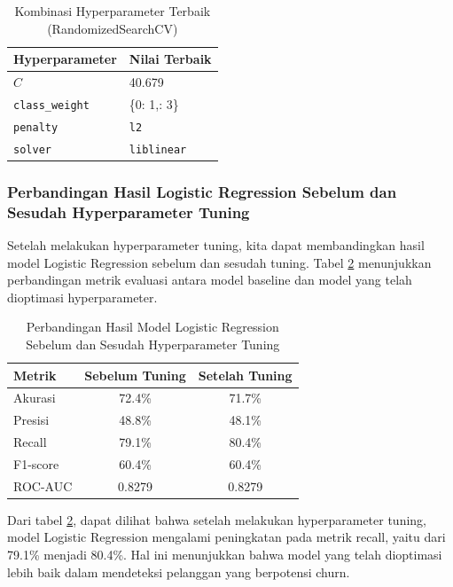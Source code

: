 \begin{table}[H]
    \centering
    \caption{Kombinasi Hyperparameter Terbaik (RandomizedSearchCV)}
    \label{tab:best_params_logreg}
    \begin{tabular}{|l|l|}
        \hline
        \textbf{Hyperparameter} & \textbf{Nilai Terbaik} \\ \hline
        $C$ & 40.679 \\ \hline
        \texttt{class\_weight} & \{0: 1,\; 1: 3\} \\ \hline
        \texttt{penalty} & \texttt{l2} \\ \hline
        \texttt{solver} & \texttt{liblinear} \\ \hline
    \end{tabular}
\end{table}

\subsubsection{Perbandingan Hasil Logistic Regression Sebelum dan Sesudah Hyperparameter Tuning}
Setelah melakukan hyperparameter tuning, kita dapat membandingkan hasil model Logistic Regression sebelum dan sesudah tuning. Tabel \ref{tab:comparison_logreg} menunjukkan perbandingan metrik evaluasi antara model baseline dan model yang telah dioptimasi hyperparameter.

\begin{table}[H]
    \centering
    \caption{Perbandingan Hasil Model Logistic Regression Sebelum dan Sesudah Hyperparameter Tuning}
    \label{tab:comparison_logreg}
    \begin{tabular}{|l|c|c|}
        \hline
        \textbf{Metrik} & \textbf{Sebelum Tuning} & \textbf{Setelah Tuning} \\ \hline
        Akurasi & 72.4\% & 71.7\% \\ \hline
        Presisi & 48.8\% & 48.1\% \\ \hline
        Recall & 79.1\% & 80.4\% \\ \hline
        F1-score & 60.4\% & 60.4\% \\ \hline
        ROC-AUC & 0.8279 & 0.8279 \\ \hline
    \end{tabular}
\end{table}

Dari tabel \ref{tab:comparison_logreg}, dapat dilihat bahwa setelah melakukan hyperparameter tuning, model Logistic Regression mengalami peningkatan pada metrik recall, yaitu dari 79.1\% menjadi 80.4\%. Hal ini menunjukkan bahwa model yang telah dioptimasi lebih baik dalam mendeteksi pelanggan yang berpotensi churn.

